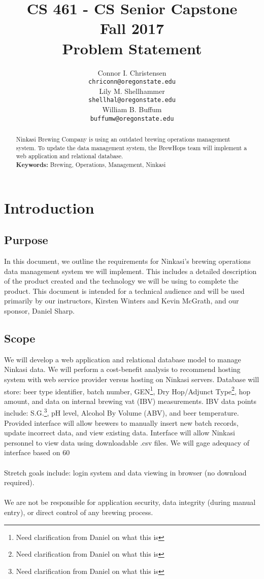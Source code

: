 \documentclass[draftclsnofoot,onecolumn,letterpaper,10pt,compsoc]{IEEEtran}
\title{CS 461 - CS Senior Capstone
	\\Fall 2017
	\\Problem Statement
}
\author{
	Connor I. Christensen \\
	\texttt{chriconn@oregonstate.edu}
	\\
	Lily M. Shellhammer \\
	\texttt{shellhal@oregonstate.edu}
	\\
	William B. Buffum \\
	\texttt{buffumw@oregonstate.edu}
}
\begin{document}
\begin{titlingpage}
    \maketitle
    \begin{abstract}
			Ninkasi Brewing Company is using an outdated brewing operations management system. To update the data management system, the BrewHops team will implement a web application and relational database.
			\\
			\textbf{Keywords:} Brewing, Operations, Management, Ninkasi
    \end{abstract}
		\pagebreak
		\tableofcontents
\end{titlingpage}

\section{Introduction}
	\subsection{Purpose}
    In this document, we outline the requirements for Ninkasi’s brewing operations data management system we will implement. This includes a detailed description of the product created and the technology we will be using to complete the product. This document is intended for a technical audience and will be used primarily by our instructors, Kirsten Winters and Kevin McGrath, and our sponsor, Daniel Sharp.
    
	\subsection{Scope}
    We will develop a web application and relational database model to manage Ninkasi data. We will perform a cost-benefit analysis to recommend hosting system with web service provider versus hosting on Ninkasi servers. Database will store: beer type identifier, batch number, GEN\footnote{Need clarification from Daniel on what this is}, Dry Hop/Adjunct Type\footnote{Need clarification from Daniel on what this is}, hop amount, and data on internal brewing vat (IBV) measurements. IBV data points include: S.G.\footnote{Need clarification from Daniel on what this is}, pH level, Alcohol By Volume (ABV), and beer temperature. Provided interface will allow brewers to manually insert new batch records, update incorrect data, and view existing data. Interface will allow Ninkasi personnel to view data using downloadable .csv files. We will gage adequacy of interface based on 60%
    \\
    \\
    Stretch goals include: login system and data viewing in browser (no download required).
    \\
    \\
    We are not be responsible for application security, data integrity (during manual entry), or direct control of any brewing process.
    
\end{document}
